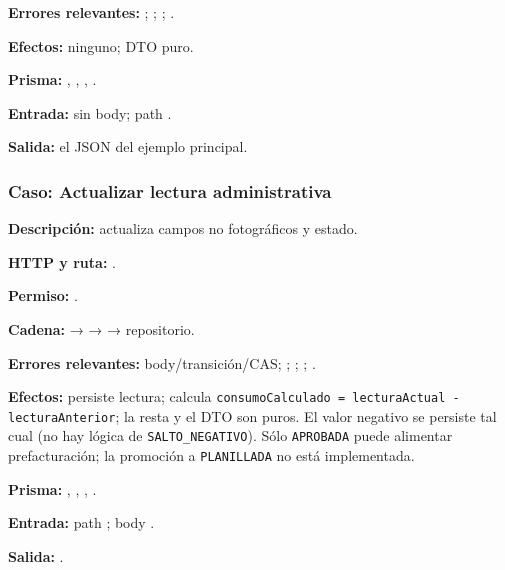 \textbf{Errores relevantes:} \texttt{}; \texttt{}; \texttt{}; \texttt{}.  

\textbf{Efectos:} ninguno; DTO puro.  

\textbf{Prisma:} \texttt{}, \texttt{}, \texttt{}, \texttt{}.  

\textbf{Entrada:} sin body; path \texttt{}.  

\textbf{Salida:} el JSON del ejemplo principal.


\subsubsection{Caso: Actualizar lectura administrativa}


\textbf{Descripción:} actualiza campos no fotográficos y estado.  

\textbf{HTTP y ruta:} \texttt{}.  

\textbf{Permiso:} \texttt{}.  

\textbf{Cadena:} \texttt{} → \texttt{} → \texttt{} → repositorio.  

\textbf{Errores relevantes:} \texttt{} body/transición/CAS; \texttt{}; \texttt{}; \texttt{}; \texttt{}.  

\textbf{Efectos:} persiste lectura; calcula \texttt{consumoCalculado = lecturaActual - lecturaAnterior}; la resta y el DTO son puros. El valor negativo se persiste tal cual (no hay lógica de \texttt{SALTO\_NEGATIVO}). Sólo \texttt{APROBADA} puede alimentar prefacturación; la promoción a \texttt{PLANILLADA} no está implementada.  

\textbf{Prisma:} \texttt{}, \texttt{}, \texttt{}, \texttt{}.  

\textbf{Entrada:} path \texttt{}; body \texttt{}.  

\textbf{Salida:} \texttt{}.


